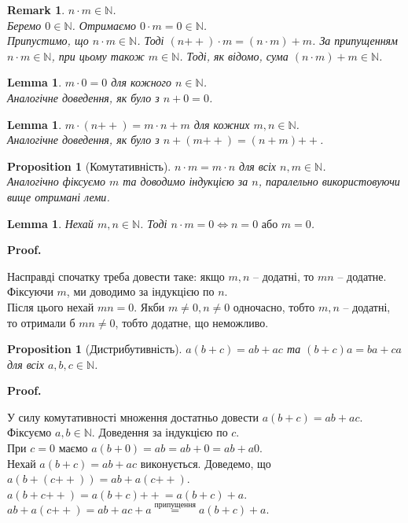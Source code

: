 \documentclass[a4paper, 14pt]{extarticle}
\makeatletter
\theoremstyle{theoremdd}
\theoremstyle{theoremdd}
\theoremstyle{theoremdd}
\theoremstyle{theoremdd}
\theoremstyle{theoremdd}
\theoremstyle{theoremdd}
\theoremstyle{theoremdd}
\theoremstyle{theoremdd}
\theoremstyle{theoremdd}
\theoremstyle{theoremdd}
\newtheorem{proposition}[theorem]{Proposition}
\theoremstyle{theoremdd}
\theoremstyle{theoremdd}
\newtheorem{remark}[theorem]{Remark}
\theoremstyle{theoremdd}
\theoremstyle{theoremdd}
\newtheorem{lemma}[theorem]{Lemma}
\theoremstyle{theoremdd}
\theoremstyle{theoremdd}
\renewenvironment{proof}[1][Proof.\\]{\par
\pushQED{\hfill \qed}%
\normalfont \topsep6\p@\@plus6\p@\relax
\trivlist
\item\relax
{\bfseries
#1\@addpunct{.}}\hspace\labelsep\ignorespaces
}{%
\popQED\endtrivlist\@endpefalse
}
\newcommand{\plusplus}{\!\!\mathrel{++}}
\makeatother
\begin{document}
\begin{remark}
$n \cdot m \in \mathbb{N}$.\\
Беремо $0 \in \mathbb{N}$. Отримаємо $0 \cdot m = 0 \in \mathbb{N}$.\\
Припустимо, що $n \cdot m \in \mathbb{N}$. Тоді $(n \plusplus) \cdot m = (n \cdot m) + m$. За припущенням $n \cdot m \in \mathbb{N}$, при цьому також $m \in \mathbb{N}$. Тоді, як відомо, сума $(n \cdot m) + m \in \mathbb{N}$.  
\end{remark}

\begin{lemma}
$m \cdot 0 = 0$ для кожного $n \in \mathbb{N}$.\\
\textit{Аналогічне доведення, як було з $n + 0 = 0$.} 
\end{lemma}

\begin{lemma}
$m \cdot (n \plusplus) = m \cdot n + m$ для кожних $m,n \in \mathbb{N}$.\\
\textit{Аналогічне доведення, як було з $n + (m \plusplus) = (n+m)\plusplus$.}
\end{lemma}

\begin{proposition}[Комутативність]
$n \cdot m = m \cdot n$ для всіх $n,m \in \mathbb{N}$.\\
\textit{Аналогічно фіксуємо $m$ та доводимо індукцією за $n$, паралельно використовуючи вище отримані леми}.
\end{proposition}

\begin{lemma}
Нехай $m,n \in \mathbb{N}$. Тоді $n \cdot m = 0 \iff n = 0 \text{ або } m = 0$. 
\end{lemma}

\begin{proof}
Насправді спочатку треба довести таке: якщо $m,n$ -- додатні, то $mn$ -- додатне. Фіксуючи $m$, ми доводимо за індукцією по $n$.\\
Після цього нехай $mn = 0$. Якби $m \neq 0, n \neq 0$ одночасно, тобто $m,n$ -- додатні, то отримали б $mn \neq 0$, тобто додатне, що неможливо. 
\end{proof}

\begin{proposition}[Дистрибутивність]
$a(b+c) = ab + ac$ та $(b+c)a = ba + ca$ для всіх $a,b,c \in \mathbb{N}$.
\end{proposition}

\begin{proof}
У силу комутативності множення достатньо довести $a(b+c) = ab + ac$.\\
Фіксуємо $a,b \in \mathbb{N}$. Доведення за індукцією по $c$.\\
При $c = 0$ маємо $a(b+0) = ab = ab + 0 = ab + a0$.\\
Нехай $a(b+c) = ab + ac$ виконується. Доведемо, що $a(b+ (c\plusplus)) = ab + a(c \plusplus)$.\\
$a(b + c\plusplus) = a (b + c) \plusplus = a (b+c) + a$.\\
$ab + a(c \plusplus) = ab + ac + a \overset{\text{припущення}}{=} a(b+c) + a$.
\end{proof}
\end{document}

